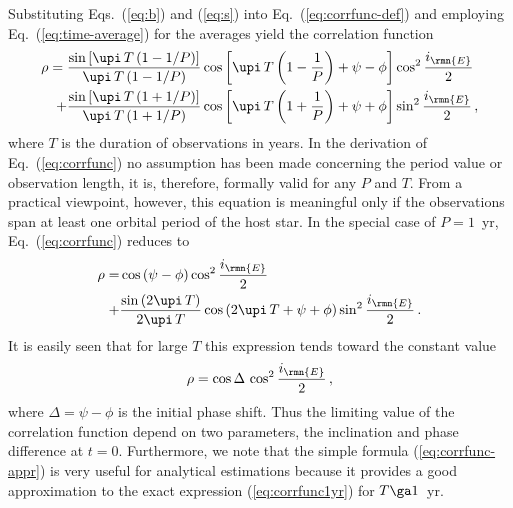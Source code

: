 \documentclass[fleqn,usenatbib,useAMS,usedcolumn]{mnras}
\begin{document}
Substituting Eqs.~(\ref{eq:b}) and (\ref{eq:s}) into Eq.~(\ref{eq:corrfunc-def}) and employing Eq.~(\ref{eq:time-average}) for the averages yield the correlation function
\begin{equation}\label{eq:corrfunc}
 \begin{aligned}
  \rho =
  \frac{\sin\left[\upi\,T\left(1-1/P\right)\right]}{\upi\,T\left(1-1/P\right)}
  &\cos\left[\upi\,T\left(1-\frac{1}{P}\right)+\psi-\phi\right]
  \cos^2\frac{i_\rmn{E}}{2} \\
  +
  \frac{\sin\left[\upi\,T\left(1+1/P\right)\right]}{\upi\,T\left(1+1/P\right)}
  &\cos\left[\upi\,T\left(1+\frac{1}{P}\right)+\psi+\phi\right]
  \sin^2\frac{i_\rmn{E}}{2}\,,
 \end{aligned}
\end{equation}
where $T$ is the duration of observations in years. In the derivation of Eq.~(\ref{eq:corrfunc}) no assumption has been made concerning the period value or observation length, it is, therefore, formally valid for any $P$ and $T$. From a practical viewpoint, however, this equation is meaningful only if the observations span at least one orbital period of the host star. In the special case of $P=1$~yr, Eq.~(\ref{eq:corrfunc}) reduces to
\begin{equation}\label{eq:corrfunc1yr}
 \begin{aligned}
  \rho =
  &\cos\left(\psi-\phi\right)
  \cos^2\frac{i_\rmn{E}}{2} \\
  +
  &\frac{\sin\left(2\upi\,T\right)}{2\upi\,T}
  \cos\left(2\upi\,T+\psi+\phi\right)
  \sin^2\frac{i_\rmn{E}}{2}\,.
 \end{aligned}
\end{equation}
It is easily seen that for large $T$ this expression tends toward the constant value
\begin{equation}\label{eq:corrfunc-appr}
  \rho=\cos\Delta\,\cos^2\frac{i_\rmn{E}}{2}\,,
\end{equation}
where $\Delta=\psi-\phi$ is the initial phase shift.
Thus the limiting value of the correlation function depend on two parameters, the inclination and phase difference at $t=0$. Furthermore, we note that the simple formula (\ref{eq:corrfunc-appr}) is very useful for analytical estimations because it provides a good approximation to the exact expression (\ref{eq:corrfunc1yr}) for $T\ga 1$~yr.
\end{document}
